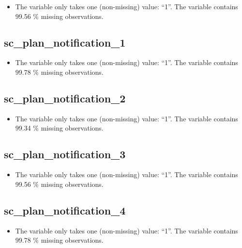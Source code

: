 \documentclass[
  letterpaper,
  DIV=11,
  numbers=noendperiod]{scrartcl}
\providecommand{\tightlist}{%
  \setlength{\itemsep}{0pt}\setlength{\parskip}{0pt}}
\begin{document}
\begin{itemize}
\tightlist
\item
  The variable only takes one (non-missing) value: ``1''. The variable
  contains 99.56 \% missing observations.
\end{itemize}

\fullline

\subsection{sc\_plan\_notification\_1}\label{sc_plan_notification_1}

\begin{itemize}
\tightlist
\item
  The variable only takes one (non-missing) value: ``1''. The variable
  contains 99.78 \% missing observations.
\end{itemize}

\fullline

\subsection{sc\_plan\_notification\_2}\label{sc_plan_notification_2}

\begin{itemize}
\tightlist
\item
  The variable only takes one (non-missing) value: ``1''. The variable
  contains 99.34 \% missing observations.
\end{itemize}

\fullline

\subsection{sc\_plan\_notification\_3}\label{sc_plan_notification_3}

\begin{itemize}
\tightlist
\item
  The variable only takes one (non-missing) value: ``1''. The variable
  contains 99.56 \% missing observations.
\end{itemize}

\fullline

\subsection{sc\_plan\_notification\_4}\label{sc_plan_notification_4}

\begin{itemize}
\tightlist
\item
  The variable only takes one (non-missing) value: ``1''. The variable
  contains 99.78 \% missing observations.
\end{itemize}
\end{document}
